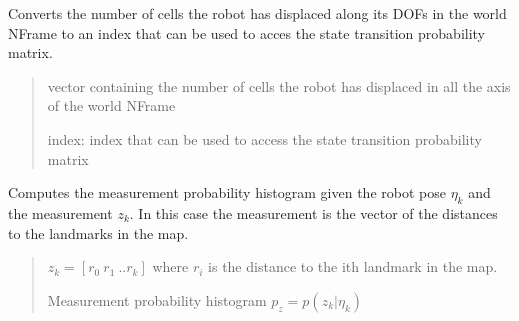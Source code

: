 \documentclass[letterpaper,10pt,english]{sphinxmanual}
\begin{document}
\begin{fulllineitems}
\begin{fulllineitems}
\label{\detokenize{GridLocalization:GL_3DOFDifferentialDrive.GL_3DOFDifferentialDrive.uk2cell}}
\pysigstartsignatures
{}
\pysigstopsignatures
\sphinxAtStartPar
Converts the number of cells the robot has displaced along its DOFs in the world N\sphinxhyphen{}Frame to an index that can be
used to acces the state transition probability matrix.
\begin{quote}\begin{description}
\sphinxAtStartPar
{} \textendash{} vector containing the number of cells the robot has displaced in all the axis of the world N\sphinxhyphen{}Frame

\sphinxAtStartPar
index: index that can be used to access the state transition probability matrix

\end{description}\end{quote}

\end{fulllineitems}


\begin{fulllineitems}
\label{\detokenize{GridLocalization:GL_3DOFDifferentialDrive.GL_3DOFDifferentialDrive.MeasurementProbability}}
\pysigstartsignatures
{}
\pysigstopsignatures
\sphinxAtStartPar
Computes the measurement probability histogram given the robot pose \(\eta_k\) and the measurement \(z_k\).
In this case the measurement is the vector of the distances to the landmarks in the map.
\begin{quote}\begin{description}
\sphinxAtStartPar
{} \textendash{} \(z_k=[r_0~r_1~..r_k]\) where \(r_i\) is the distance to the i\sphinxhyphen{}th landmark in the map.

\sphinxAtStartPar
Measurement probability histogram \(p_z=p(z_k | \eta_k)\)

\end{description}\end{quote}


\end{fulllineitems}
\end{fulllineitems}
\end{document}
